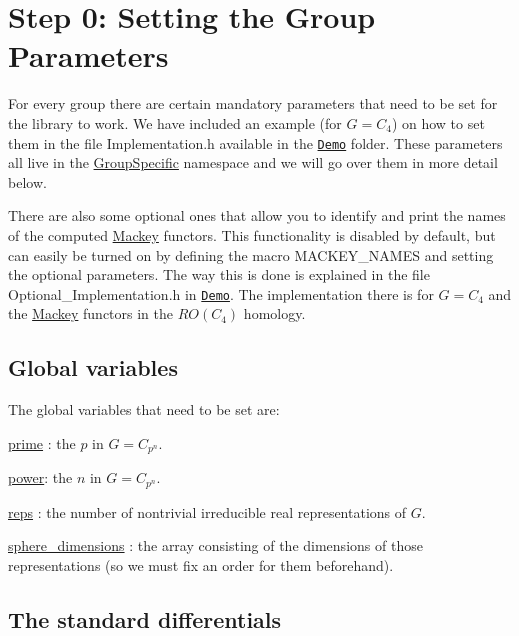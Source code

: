 \hypertarget{use_how}{}\section{Step 0\+: Setting the Group Parameters}\label{use_how}

\begin{DoxyItemize}
\item For every group there are certain mandatory parameters that need to be set for the library to work. We have included an example (for $G=C_4$) on how to set them in the file Implementation.\+h available in the \href{https://github.com/NickG-Math/Mackey/tree/master/Demo}{\tt Demo} folder. These parameters all live in the \hyperlink{namespaceGroupSpecific}{Group\+Specific} namespace and we will go over them in more detail below.
\item There are also some optional ones that allow you to identify and print the names of the computed \hyperlink{namespaceMackey}{Mackey} functors. This functionality is disabled by default, but can easily be turned on by defining the macro {\ttfamily M\+A\+C\+K\+E\+Y\+\_\+\+N\+A\+M\+ES} and setting the optional parameters. The way this is done is explained in the file Optional\+\_\+\+Implementation.\+h in \href{https://github.com/NickG-Math/Mackey/tree/master/Demo}{\tt Demo}. The implementation there is for $G=C_4$ and the \hyperlink{namespaceMackey}{Mackey} functors in the $RO(C_4)$ homology.
\end{DoxyItemize}\hypertarget{use_var}{}\subsection{Global variables}\label{use_var}
The global variables that need to be set are\+:


\begin{DoxyItemize}
\item \hyperlink{classGroupSpecific_1_1Variables_a38586ec998bcbfdf325e6cfc6598b54b}{prime} \+: the $p$ in $G=C_{p^n}$.
\item \hyperlink{classGroupSpecific_1_1Variables_ac9bd6be19cc41e6877ee25a2d1c7be80}{power}\+: the $n$ in $G=C_{p^n}$.
\item \hyperlink{classGroupSpecific_1_1Variables_a5504789b0b60050e6ea223fdeb84874a}{reps} \+: the number of nontrivial irreducible real representations of $G$.
\item \hyperlink{classGroupSpecific_1_1Variables_a4746f16736abcf4c705dd8690ec12ca0}{sphere\+\_\+dimensions} \+: the array consisting of the dimensions of those representations (so we must fix an order for them beforehand).
\end{DoxyItemize}\hypertarget{use_fun}{}\subsection{The standard differentials}\label{use_fun}

